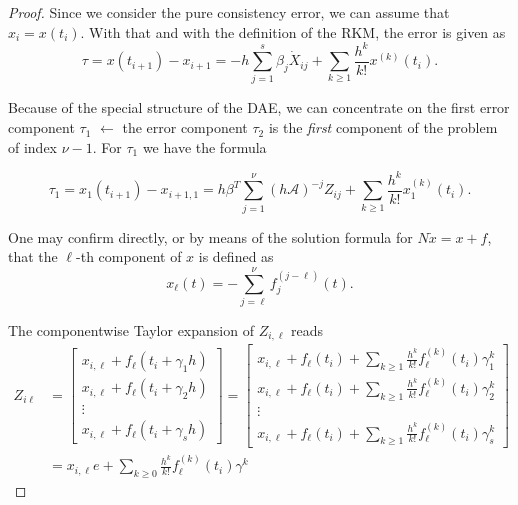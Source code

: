 \documentclass[]{book}
\theoremstyle{definition}
\theoremstyle{definition}
\theoremstyle{definition}
\theoremstyle{definition}
\theoremstyle{remark}
\begin{document}
\begin{proof}
{}Since we consider the pure consistency error, we can assume that \(x_i=x(t_i)\). With that and with the definition of the RKM, the error is given as
\[
\tau = x(t_{i+1}) - x_{i+1} = -h\sum_{j=1}^s \beta_j \dot X_{ij} + \sum_{k\geq 1} \frac{h^k}{k!}x^{(k)}(t_i).
\]

Because of the special structure of the DAE, we can concentrate on the first error component \(\tau_1\) \(\leftarrow\) the error component \(\tau_2\) is the \emph{first} component of the problem of index \(\nu-1\). For \(\tau_1\) we have the formula

\[
\tau_1 = x_1(t_{i+1}) - x_{i+1,1} = h\beta^T\sum_{j=1}^\nu (h\mathcal A)^{-j}Z_{ij} + \sum_{k\geq 1} \frac{h^k}{k!}x_1^{(k)}(t_i).
\]

One may confirm directly, or by means of the solution formula for \(N\dot x = x + f\), that the \(\ell\)-th component of \(x\) is defined as
\[
x_\ell(t) = - \sum_{j=\ell}^{\nu}f_j^{(j-\ell)}(t).
\]

The componentwise Taylor expansion of \(Z_{i,\ell}\) reads
\begin{align*}
Z_{i\ell} 
&= 
\begin{bmatrix}
x_{i,\ell} + f_\ell(t_i+\gamma_1 h) \\
x_{i,\ell} + f_\ell(t_i+\gamma_2 h) \\
\vdots \\
x_{i,\ell} + f_\ell(t_i+\gamma_s h) 
\end{bmatrix}
=
\begin{bmatrix}
    x_{i,\ell} + f_\ell(t_i) + \sum_{k\geq 1}\frac{h^k}{k!}f_\ell^{(k)}(t_i)\gamma_1^k \\
  x_{i,\ell} + f_\ell(t_i) + \sum_{k\geq 1}\frac{h^k}{k!}f_\ell^{(k)}(t_i)\gamma_2 ^k \\
\vdots \\
  x_{i,\ell} + f_\ell(t_i) + \sum_{k\geq 1}\frac{h^k}{k!}f_\ell^{(k)}(t_i)\gamma_s ^k 
\end{bmatrix} \\
&=
x_{i,\ell}e+\sum_{k\geq 0} \frac{h^k}{k!}f_\ell^{(k)}(t_i)\gamma^k
\end{align*}


\end{proof}
\end{document}
